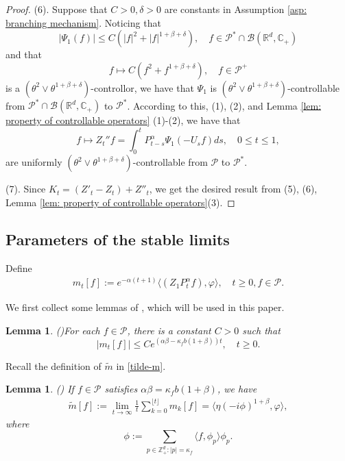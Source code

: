 \documentclass[12pt,a4paper]{amsart}
\theoremstyle{plain}
\newtheorem{lem}[thm]{Lemma}
\theoremstyle{definition}
\numberwithin{equation}{section}
\begin{document}
\begin{proof}
    (6). Suppose that $C>0, \delta>0$ are constants in Assumption \ref{asp: branching mechanism}.
    Noticing that
\[
    |\Psi_1(f)|
    \le C(|f|^2+|f|^{1+\beta+ \delta}),
    \quad f\in \mathcal P^*\cap\mathcal B(\mathbb R^d, \mathbb C_+)
\]
    and that
\[
    f\mapsto C(f^2+f^{1+\beta+\delta}),
    \quad f\in \mathcal P^+
\]
    is a $(\theta^2 \vee \theta^{1+\beta+\delta})$-controllor, we have that $\Psi_1$ is $(\theta^2 \vee \theta^{1+\beta+\delta})$-controllable from $\mathcal P^*\cap\mathcal B(\mathbb R^d, \mathbb C_+)$ to $\mathcal P^*$.
    According to this, (1), (2), and Lemma \ref{lem: property of controllable operators} (1)-(2), we have that
\[
    f
    \mapsto Z_t'' f
    = \int_0^t P_{t-s}^\alpha \Psi_1(-U_sf)ds,
    \quad 0\leq t\leq 1,
\]
    are uniformly $(\theta^2 \vee \theta^{1+\beta+\delta})$-controllable from $\mathcal P$ to $\mathcal P^*$.

(7). Since $K_t = (Z'_t-Z_t)+Z''_t$, we get the desired result from (5), (6), Lemma \ref{lem: property of controllable operators}(3).
\end{proof}

\subsection{Parameters of the stable limits}
   Define
 \begin{equation}\begin{split}
 \label{parameter_mk}
      m_t[f]
      :=e^{-\alpha (t+1)} \langle (Z_1P^\alpha_t f), \varphi\rangle,\quad t\geq 0, f\in \mathcal P.
 \end{split}\end{equation}

 We first collect some lemmas of \cite{MM}, which will be used in this paper.
 \begin{lem}(\cite[Lemma 2.7]{MM})\label{Lemma2.7} For each $f\in\mathcal{P}$, there is a constant $C>0$ such that
\begin{equation}\label{domi-m}
    |m_t[f]|
    \leq C e^{(\alpha\beta-\kappa_fb(1+\beta))t},
    \quad t\geq 0.
\end{equation}
\end{lem}
 Recall the definition of $\widetilde{m}$ in \eqref{tilde-m}.
  \begin{lem}(\cite[Lemma 4.2]{MM})
    If $f \in \mathcal{P}$ satisfies $\alpha\beta=\kappa_f b(1+\beta)$,
    we have
\begin{equation}\begin{split}
\label{para: critical case}
 \widetilde{m}[f]:=\lim_{t\rightarrow \infty}\frac{1}{t}\sum_{k=0}^{\lfloor t \rfloor}m_k[f]=\langle\eta(-i\phi)^{1+\beta},\varphi\rangle,
\end{split}\end{equation}
    where
\[
    \phi
    :=\sum_{p\in \mathbb Z_+^d:|p|=\kappa_f}\langle f, \phi_p\rangle\phi_p.
\]
\end{lem}
\end{document}
